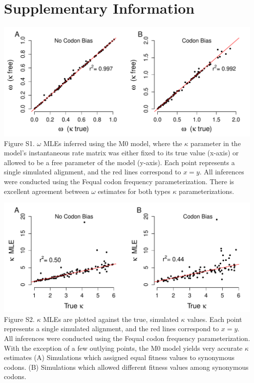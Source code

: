 \documentclass{pnastwo}
\begin{document}
\clearpage

	
\section{Supplementary Information}
	
\vspace{2cm}
	
\includegraphics[width=5.5in]{figures/SI/omega_kappafree_kappatrue.pdf}
\noindent Figure S1. $\omega$ MLEs inferred using the M0 model, where the $\kappa$ parameter in the model's instantaneous rate matrix was either fixed to its true value (x-axis) or allowed to be a free parameter of the model (y-axis). Each point represents a single simulated alignment, and the red lines correspond to $x=y$. All inferences were conducted using the Fequal codon frequency parameterization. There is excellent agreement between $\omega$ estimates for both types $\kappa$ parameterizations.

	
\vspace{2cm}
	
\includegraphics[width=5.5in]{figures/SI/kappa_regressions.pdf}
\noindent Figure S2. $\kappa$ MLEs are plotted against the true, simulated $\kappa$ values. Each point represents a single simulated alignment, and the red lines correspond to $x=y$. All inferences were conducted using the Fequal codon frequency parameterization. With the exception of a few outlying points, the M0 model yields very accurate $\kappa$ estimates (A) Simulations which assigned equal fitness values to synonymous codons. (B) Simulations which allowed different fitness values among synonymous codons.
	
\end{document}
